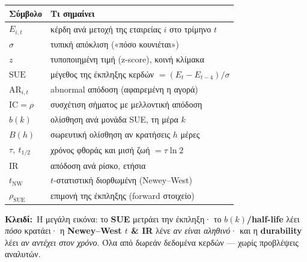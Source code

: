 \documentclass[11pt]{article}
\newcommand{\key}[1]{\par\medskip\noindent\colorbox{soft}{\parbox{\dimexpr\linewidth-2\fboxsep}{\textcolor{accent}{\textbf{Κλειδί:}}\ #1}}\par\medskip}
\begin{document}
\begin{center}
\renewcommand{\arraystretch}{1.35}
\begin{tabular}{@{}l l@{}}
\hline
\textbf{Σύμβολο} & \textbf{Τι σημαίνει}\\
\hline
$E_{i,t}$ & κέρδη ανά μετοχή της εταιρείας $i$ στο τρίμηνο $t$\\
$\sigma$ & τυπική απόκλιση («πόσο κουνιέται»)\\
$z$ & τυποποιημένη τιμή (z-score), κοινή κλίμακα\\
$\mathrm{SUE}$ & μέγεθος της έκπληξης κερδών $=(E_t-E_{t-4})/\sigma$\\
$\mathrm{AR}_{i,t}$ & abnormal απόδοση (αφαιρεμένη η αγορά)\\
$\mathrm{IC}=\rho$ & συσχέτιση σήματος με μελλοντική απόδοση\\
$b(k)$ & ολίσθηση ανά μονάδα SUE, τη μέρα $k$\\
$B(h)$ & σωρευτική ολίσθηση αν κρατήσεις $h$ μέρες\\
$\tau,\ t_{1/2}$ & χρόνος φθοράς και μισή ζωή $=\tau\ln 2$\\
$\mathrm{IR}$ & απόδοση ανά ρίσκο, ετήσια\\
$t_{\text{NW}}$ & $t$-στατιστική διορθωμένη (Newey--West)\\
$\rho_{\text{SUE}}$ & επιμονή της έκπληξης (forward στοιχείο)\\
\hline
\end{tabular}
\end{center}

\bigskip
\key{Η μεγάλη εικόνα: το \textbf{SUE} μετράει την έκπληξη· το \textbf{$b(k)$/half-life} λέει
\emph{πόσο} κρατάει· η \textbf{Newey--West $t$ \& IR} λένε \emph{αν είναι αληθινό}· και η
\textbf{durability} λέει \emph{αν αντέχει στον χρόνο}. Όλα από δωρεάν δεδομένα κερδών — χωρίς
προβλέψεις αναλυτών.}
\end{document}
